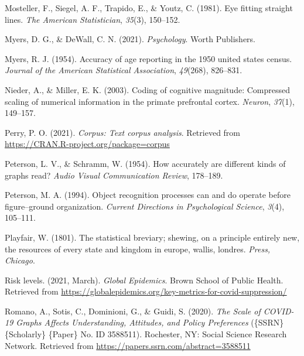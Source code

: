 \documentclass[print]{nuthesis}
\newlength{\cslhangindent}
\newenvironment{CSLReferences}%
{\setlength{\parindent}{0pt}%
\everypar{\setlength{\hangindent}{\cslhangindent}}\ignorespaces}%
{\par}
\begin{document}
\begin{CSLReferences}{1}{0}
\leavevmode{}%
Mosteller, F., Siegel, A. F., Trapido, E., \& Youtz, C. (1981). Eye fitting straight lines. \emph{The American Statistician}, \emph{35}(3), 150--152.

\leavevmode{}%
Myers, D. G., \& DeWall, C. N. (2021). \emph{Psychology}. Worth Publishers.

\leavevmode{}%
Myers, R. J. (1954). Accuracy of age reporting in the 1950 united states census. \emph{Journal of the American Statistical Association}, \emph{49}(268), 826--831.

\leavevmode{}%
Nieder, A., \& Miller, E. K. (2003). Coding of cognitive magnitude: Compressed scaling of numerical information in the primate prefrontal cortex. \emph{Neuron}, \emph{37}(1), 149--157.

\leavevmode{}%
Perry, P. O. (2021). \emph{Corpus: Text corpus analysis}. Retrieved from \url{https://CRAN.R-project.org/package=corpus}

\leavevmode{}%
Peterson, L. V., \& Schramm, W. (1954). How accurately are different kinds of graphs read? \emph{Audio Visual Communication Review}, 178--189.

\leavevmode{}%
Peterson, M. A. (1994). Object recognition processes can and do operate before figure--ground organization. \emph{Current Directions in Psychological Science}, \emph{3}(4), 105--111.

\leavevmode{}%
Playfair, W. (1801). The statistical breviary; shewing, on a principle entirely new, the resources of every state and kingdom in europe, wallis, londres. \emph{Press, Chicago}.

\leavevmode{}%
Risk levels. (2021, March). \emph{Global Epidemics}. Brown School of Public Health. Retrieved from \url{https://globalepidemics.org/key-metrics-for-covid-suppression/}

\leavevmode{}%
Romano, A., Sotis, C., Dominioni, G., \& Guidi, S. (2020). \emph{The {Scale} of {COVID}-19 {Graphs} {Affects} {Understanding}, {Attitudes}, and {Policy} {Preferences}} (\{SSRN\} \{Scholarly\} \{Paper\} No. ID 3588511). Rochester, NY: Social Science Research Network. Retrieved from \url{https://papers.ssrn.com/abstract=3588511}


\end{CSLReferences}
\end{document}
